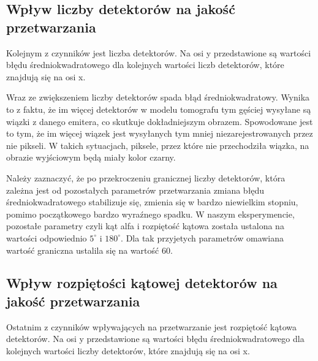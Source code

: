\documentclass{article}
\begin{document}
\subsection{Wpływ liczby detektorów na jakość przetwarzania}
\label{subsec_detectors_amount_comparison}



Kolejnym z czynników jest liczba detektorów. Na osi y przedstawione są wartości błędu średniokwadratowego dla kolejnych wartości liczb detektorów, które znajdują się na osi x. 


Wraz ze zwiększeniem liczby detektorów spada błąd średniokwadratowy. Wynika to z faktu, że im więcej detektorów w modelu tomografu tym gęściej wysyłane są wiązki z danego emitera, co skutkuje dokładniejszym obrazem. Spowodowane jest to tym, że im więcej wiązek jest wysyłanych tym mniej niezarejestrowanych przez nie pikseli. W takich sytuacjach, piksele, przez które nie przechodziła wiązka, na obrazie wyjściowym będą miały kolor czarny.

Należy zaznaczyć, że po przekroczeniu granicznej liczby detektorów, która zależna jest od pozostałych parametrów przetwarzania zmiana błędu średniokwadratowego stabilizuje się, zmienia się w bardzo niewielkim stopniu, pomimo początkowego bardzo wyraźnego spadku.
W naszym eksperymencie, pozostałe parametry czyli kąt alfa i rozpiętość kątowa została ustalona na wartości odpowiednio $5 ^{\circ}$ i $180 ^{\circ}$. Dla tak przyjetych parametrów omawiana wartość graniczna ustalila się na wartość 60. 

\subsection{Wpływ rozpiętości kątowej detektorów na jakość przetwarzania}
\label{subsec_cone_width_comparison}

Ostatnim z czynników wpływających na przetwarzanie jest rozpiętość kątowa detektorów. Na osi y przedstawione są wartości błędu średniokwadratowego dla kolejnych wartości liczby detektorów, które znajdują się na osi x.

\end{document}
